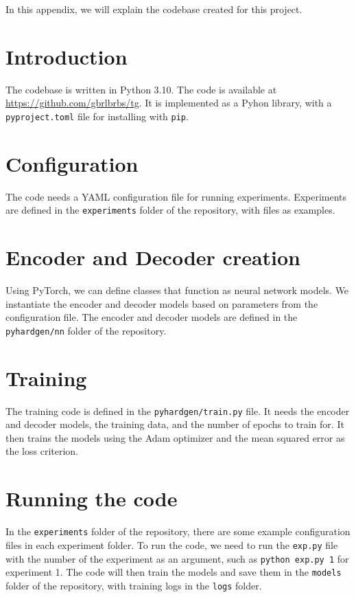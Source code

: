 In this appendix, we will explain the codebase created for this project.

\section{Introduction}

The codebase is written in Python 3.10. The code is available at \url{https://github.com/gbrlbrbs/tg}. It is implemented as a Pyhon library, with a \texttt{pyproject.toml} file for installing with \texttt{pip}.

\section{Configuration}

The code needs a YAML configuration file for running experiments. Experiments are defined in the \texttt{experiments} folder of the repository, with files as examples.

\section{Encoder and Decoder creation}

Using PyTorch, we can define classes that function as neural network models. We instantiate the encoder and decoder models based on parameters from the configuration file. The encoder and decoder models are defined in the \texttt{pyhardgen/nn} folder of the repository. 

\section{Training}

The training code is defined in the \texttt{pyhardgen/train.py} file. It needs the encoder and decoder models, the training data, and the number of epochs to train for. It then trains the models using the Adam optimizer and the mean squared error as the loss criterion.

\section{Running the code}

In the \texttt{experiments} folder of the repository, there are some example configuration files in each experiment folder. To run the code, we need to run the \texttt{exp.py} file with the number of the experiment as an argument, such as \texttt{python exp.py 1} for experiment 1. The code will then train the models and save them in the \texttt{models} folder of the repository, with training logs in the \texttt{logs} folder.


